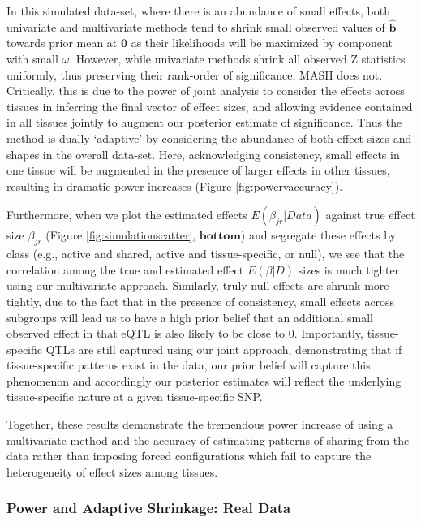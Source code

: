 In this simulated data-set, where there is an abundance of small effects, both univariate and multivariate methods tend to shrink small observed values of $\hat{\bm{b}}$ towards prior mean at $\bm{0}$ as their likelihoods will be maximized by component with small $\omega$. However, while univariate methods shrink all observed Z statistics uniformly, thus preserving their rank-order of significance, MASH does not. Critically, this is due to the power of joint analysis to consider the effects across tissues in inferring the final vector of effect sizes, and allowing evidence contained in all tissues jointly to augment our posterior estimate of significance. Thus the method is dually `adaptive' by considering the abundance of both effect sizes and shapes in the overall data-set.  Here, acknowledging consistency, small effects in one tissue will be augmented in the presence of larger effects in other tissues, resulting in dramatic power increases (Figure \ref{fig:powervaccuracy}). 

Furthermore, when we plot the estimated effects $E(\beta_{jr}|Data)$ against true effect size $\beta_{jr}$ (Figure \ref{fig:simulationscatter}, $\textbf{bottom}$) and segregate these effects by class  (e.g., active and shared, active and tissue-specific, or null), we see that the correlation among the true and estimated effect $E(\beta|D)$ sizes is much tighter using our multivariate approach. Similarly, truly null effects are shrunk more tightly, due to the fact that in the presence of consistency, small effects across subgroups will lead us to have a high prior belief that an additional small observed effect in that eQTL is also likely to be close to 0. Importantly, tissue-specific QTLs are still captured using our joint approach, demonstrating that if tissue-specific patterns exist in the data, our prior belief will capture this phenomenon and accordingly our posterior estimates will reflect the underlying tissue-specific nature at a given tissue-specific SNP.

Together, these results demonstrate the tremendous power increase of using a multivariate method and the accuracy of estimating patterns of sharing from the data rather than imposing forced configurations which fail to capture the heterogeneity of effect sizes among tissues.


\subsubsection{Power and Adaptive Shrinkage: Real Data}

